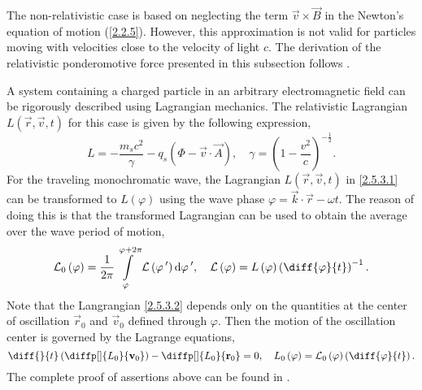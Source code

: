 The non-relativistic case is based on neglecting the term $ \vec{v} \times \vec{B} $ in the Newton's equation of motion (\ref{2.2.5}). However, this approximation is not valid for particles moving with velocities close to the velocity of light $ c $. The derivation of the relativistic ponderomotive force presented in this subsection follows \cite{Bauer1995, Mulser2010}.

A system containing a charged particle in an arbitrary electromagnetic field can be rigorously described using Lagrangian mechanics. The relativistic Lagrangian $ L \left( \vec{r}, \vec{v}, t \right)  $ for this case is given by the following expression,
\begin{equation}
\label{2.5.3.1}
L = -\frac{m_s c^2}{\gamma} - q_s \left(\Phi - \vec{v} \cdot \vec{A} \right), \quad \gamma = \left( 1 - \frac{v^{2}}{c} \right)^{-\frac{1}{2}}.
\end{equation}
For the traveling monochromatic wave, the Lagrangian $ L \left( \vec{r}, \vec{v}, t \right)  $ in \ref{2.5.3.1} can be transformed to $ L \left( \varphi \right)  $ using the wave phase $ \varphi = \vec{k} \cdot \vec{r} - \omega t $. The reason of doing this is that the transformed Lagrangian can be used to obtain the average over the wave period of motion,
\begin{equation}
\label{2.5.3.2}
\mathcal{L}_0 \left( \varphi \right) = \frac{1}{2 \pi} \int \limits_{\varphi}^{\varphi + 2\pi} \mathcal{L} \left( \varphi^{\: \prime} \right) \mathrm{d} \varphi^{\: \prime}, \quad \mathcal{L} \left( \varphi \right) = L \left( \varphi \right) \left( \diff{\varphi}{t} \right)^{-1}.
\end{equation}
Note that the Langrangian \ref{2.5.3.2} depends only on the quantities at the center of oscillation $ \vec{r}_0 $ and $ \vec{v}_0 $ defined through $ \varphi $. Then the motion of the oscillation center is governed by the Lagrange equations,
\begin{equation}
\label{2.5.3.3}
\diff{}{t} \left( \diffp[]{L_0}{\vec{v}_0} \right) -  \diffp[]{L_0}{\vec{r}_0} = 0, \quad L_0 \left( \varphi \right) = \mathcal{L}_0 \left( \varphi \right) \left( \diff{\varphi}{t} \right).
\end{equation}
The complete proof of assertions above can be found in \cite{Bauer1995}.

